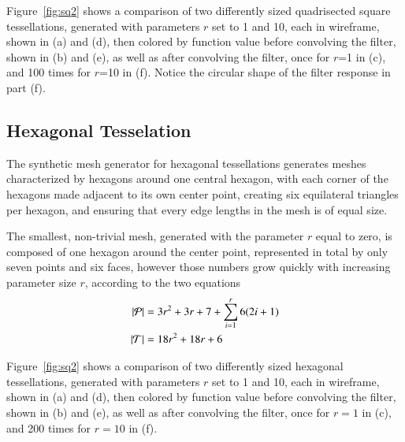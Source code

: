 Figure~\ref{fig:sq2} shows a comparison of two differently sized quadrisected square tessellations, generated with parameters $r$ set to 1 and 10, each in wireframe, shown in (a) and (d), then colored by function value before convolving the filter, shown in (b) and (e), as well as after convolving the filter, once for $r$=1 in (c), and 100 times for $r$=10 in (f). Notice the circular shape of the filter response in part (f).

%

%
%
%
%
\pagebreak
\subsection{Hexagonal Tesselation}
The synthetic mesh generator for hexagonal tessellations generates meshes characterized by hexagons around one central hexagon, with each corner of the hexagons made adjacent to its own center point, creating six equilateral triangles per hexagon, and ensuring that every edge lengths in the mesh is of equal size.

The smallest, non-trivial mesh, generated with the parameter $r$ equal to zero, is composed of one hexagon around the center point, represented in total by only seven points and six faces, however those numbers grow quickly with increasing parameter size $r$, according to the two equations
\begin{align}
	|\mathcal{P}| &= 3r^2 + 3r + 7 +\sum_{i=1}^r{6(2i + 1)}\\
	|\mathcal{T}| &= 18r^2 + 18r + 6
	\label{eq:hexPointAndFaceCounts}
\end{align}

Figure~\ref{fig:sq2} shows a comparison of two differently sized hexagonal tessellations, generated with parameters $r$ set to 1 and 10, each in wireframe, shown in (a) and (d), then colored by function value before convolving the filter, shown in (b) and (e), as well as after convolving the filter, once for $r=1$ in (c), and 200 times for $r=10$ in (f).
%

%
%
%
%
\pagebreak
